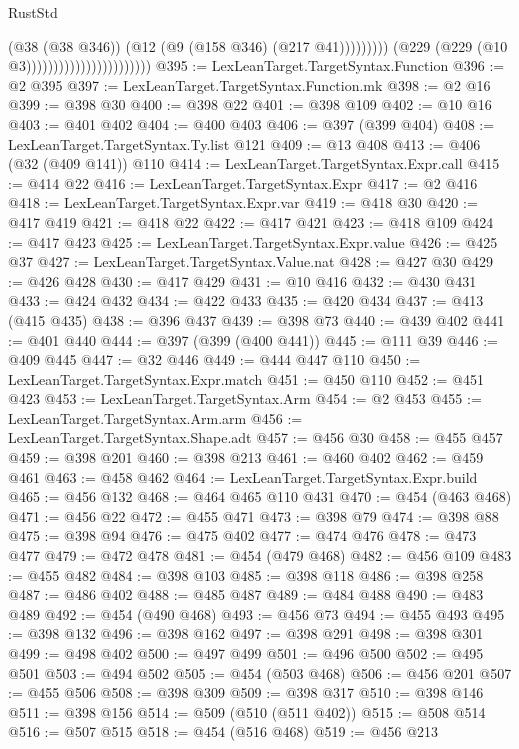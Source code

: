 \begin{lexlean}{RustStd}
\begin{coremodule}
                                                        (@38 (@38 @346))
                                                        (@12 (@9 (@158 @346) (@217 @41)))))))))
                                            (@229 (@229 (@10 @3)))))))))))))))))))))))
@395 := LexLeanTarget.TargetSyntax.Function
@396 := @2 @395
@397 := LexLeanTarget.TargetSyntax.Function.mk
@398 := @2 @16
@399 := @398 @30
@400 := @398 @22
@401 := @398 @109
@402 := @10 @16
@403 := @401 @402
@404 := @400 @403
@406 := @397 (@399 @404)
@408 := LexLeanTarget.TargetSyntax.Ty.list @121
@409 := @13 @408
@413 := @406 (@32 (@409 @141)) @110
@414 := LexLeanTarget.TargetSyntax.Expr.call
@415 := @414 @22
@416 := LexLeanTarget.TargetSyntax.Expr
@417 := @2 @416
@418 := LexLeanTarget.TargetSyntax.Expr.var
@419 := @418 @30
@420 := @417 @419
@421 := @418 @22
@422 := @417 @421
@423 := @418 @109
@424 := @417 @423
@425 := LexLeanTarget.TargetSyntax.Expr.value
@426 := @425 @37
@427 := LexLeanTarget.TargetSyntax.Value.nat
@428 := @427 @30
@429 := @426 @428
@430 := @417 @429
@431 := @10 @416
@432 := @430 @431
@433 := @424 @432
@434 := @422 @433
@435 := @420 @434
@437 := @413 (@415 @435)
@438 := @396 @437
@439 := @398 @73
@440 := @439 @402
@441 := @401 @440
@444 := @397 (@399 (@400 @441))
@445 := @111 @39
@446 := @409 @445
@447 := @32 @446
@449 := @444 @447 @110
@450 := LexLeanTarget.TargetSyntax.Expr.match
@451 := @450 @110
@452 := @451 @423
@453 := LexLeanTarget.TargetSyntax.Arm
@454 := @2 @453
@455 := LexLeanTarget.TargetSyntax.Arm.arm
@456 := LexLeanTarget.TargetSyntax.Shape.adt
@457 := @456 @30
@458 := @455 @457
@459 := @398 @201
@460 := @398 @213
@461 := @460 @402
@462 := @459 @461
@463 := @458 @462
@464 := LexLeanTarget.TargetSyntax.Expr.build
@465 := @456 @132
@468 := @464 @465 @110 @431
@470 := @454 (@463 @468)
@471 := @456 @22
@472 := @455 @471
@473 := @398 @79
@474 := @398 @88
@475 := @398 @94
@476 := @475 @402
@477 := @474 @476
@478 := @473 @477
@479 := @472 @478
@481 := @454 (@479 @468)
@482 := @456 @109
@483 := @455 @482
@484 := @398 @103
@485 := @398 @118
@486 := @398 @258
@487 := @486 @402
@488 := @485 @487
@489 := @484 @488
@490 := @483 @489
@492 := @454 (@490 @468)
@493 := @456 @73
@494 := @455 @493
@495 := @398 @132
@496 := @398 @162
@497 := @398 @291
@498 := @398 @301
@499 := @498 @402
@500 := @497 @499
@501 := @496 @500
@502 := @495 @501
@503 := @494 @502
@505 := @454 (@503 @468)
@506 := @456 @201
@507 := @455 @506
@508 := @398 @309
@509 := @398 @317
@510 := @398 @146
@511 := @398 @156
@514 := @509 (@510 (@511 @402))
@515 := @508 @514
@516 := @507 @515
@518 := @454 (@516 @468)
@519 := @456 @213

\end{coremodule}
\end{lexlean}
